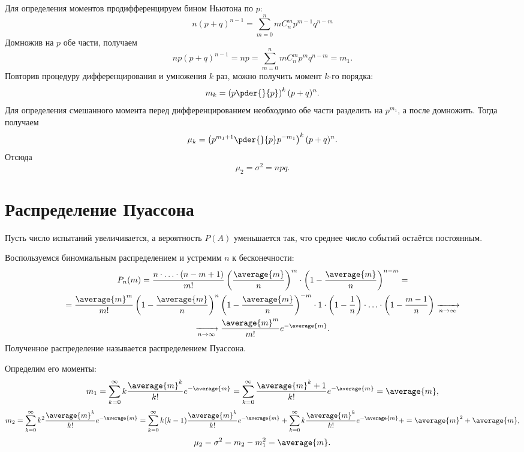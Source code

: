     Для определения моментов продифференцируем бином Ньютона по \( p \):
    \[
        n(p+q)^{n-1} = \sum_{m=0}^n m C_n^m p^{m-1} q^{n-m}
    \]
    Домножив на \( p \) обе части, получаем
    \[
        np(p+q)^{n-1} = np = \sum_{m=0}^n m C_n^m p^m q^{n-m} = m_1.
    \]
    Повторив процедуру дифференцирования и умножения \( k \) раз, можно получить
    момент \( k \)-го порядка:
    \[
        m_k = \left( p \pder{}{p} \right)^k (p+q)^n.
    \]
    Для определения смешанного момента перед дифференцированием необходимо обе
    части разделить на \( p^{m_1} \), а после домножить. Тогда получаем
    \[
        \mu_k = \left( p^{m_1+1} \pder{}{p} p^{-m_1} \right)^k (p+q)^n.
    \]
    Отсюда
    \[
        \mu_2 = \sigma^2 = npq.
    \]

\section{Распределение Пуассона}

    Пусть число испытаний увеличивается, а вероятность \( P(A) \) уменьшается
    так, что среднее число событий остаётся постоянным.

    Воспользуемся биномиальным распределением и устремим \( n \) к
    бесконечности:
    \begin{gather*}
        P_n(m) = \frac{n\cdot\ldots\cdot(n-m+1)}{m!}
        \left(\frac{\average{m}}{n}\right)^m\cdot
        \left(1 - \frac{\average{m}}{n}\right)^{n-m} =\\
        =\frac{\average{m}^m}{m!}\left(1 - \frac{\average{m}}{n}\right)^n
        \left(1 - \frac{\average{m}}{n}\right)^{-m} \cdot 1 \cdot
        \left(1 - \frac{1}{n}\right)\cdot\ldots\cdot
        \left(1 - \frac{m-1}{n}\right) \xrightarrow[n\to\infty]{}\\
        \xrightarrow[n\to\infty]{} \frac{\average{m}^m}{m!}e^{-\average{m}}.
    \end{gather*}
    Полученное распределение называется распределением Пуассона.

    Определим его моменты:
    \[
        m_1 = \sum_{k=0}^\infty k\frac{\average{m}^k}{k!}e^{-\average{m}} =
        \sum_{k=0}^\infty \frac{\average{m}^k+1}{k!}e^{-\average{m}} =
        \average{m},
    \]
    \[
        m_2 = \sum_{k=0}^\infty k^2\frac{\average{m}^k}{k!}e^{-\average{m}} =
        \sum_{k=0}^\infty k(k-1)\frac{\average{m}^k}{k!}e^{-\average{m}} +
        \sum_{k=0}^\infty k\frac{\average{m}^k}{k!}e^{-\average{m}} +
        = \average{m}^2 + \average{m},
    \]
    \[
        \mu_2 = \sigma^2 = m_2 - m_1^2 = \average{m}.
    \]

